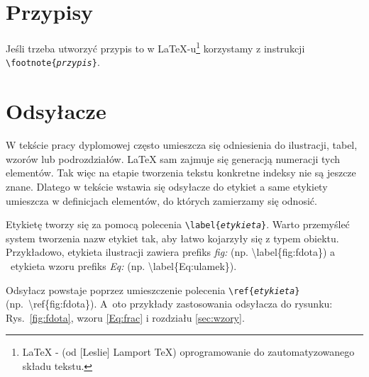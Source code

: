 \section{Przypisy}
Jeśli trzeba utworzyć przypis to w {\LaTeX}-u\footnote{{\LaTeX} - (od [Leslie] Lamport {\TeX}) oprogramowanie do zautomatyzowanego składu tekstu.}  korzystamy z instrukcji \texttt{ \textbackslash footnote\{\textit{przypis}\}}.

\section{Odsyłacze}
W tekście pracy dyplomowej często umieszcza się odniesienia do ilustracji, tabel, wzorów lub podrozdziałów.  {\LaTeX} sam zajmuje się generacją numeracji tych elementów. Tak więc na etapie tworzenia tekstu konkretne indeksy nie są jeszcze znane. Dlatego w tekście wstawia się odsyłacze do etykiet a same etykiety umieszcza w definicjach elementów, do których zamierzamy się odnosić.

Etykietę tworzy się za pomocą polecenia \texttt{\textbackslash label\{\textit{etykieta}\}}. Warto przemyśleć system tworzenia nazw etykiet tak, aby łatwo kojarzyły się z typem obiektu. Przykładowo, etykieta ilustracji zawiera prefiks \textit{fig:} (np. \textbackslash label\{fig:fdota\}) a ~etykieta wzoru  prefiks \textit{Eq:} (np. \textbackslash label\{Eq:ulamek\}). 

Odsyłacz powstaje poprzez umieszczenie polecenia \texttt{\textbackslash ref\{\textit{etykieta}\}} (np.~\textbackslash ref\{fig:fdota\}). A~oto przykłady zastosowania odsyłacza do rysunku: Rys.~\ref{fig:fdota}, wzoru  \ref{Eq:frac} i rozdziału \ref{sec:wzory}.

